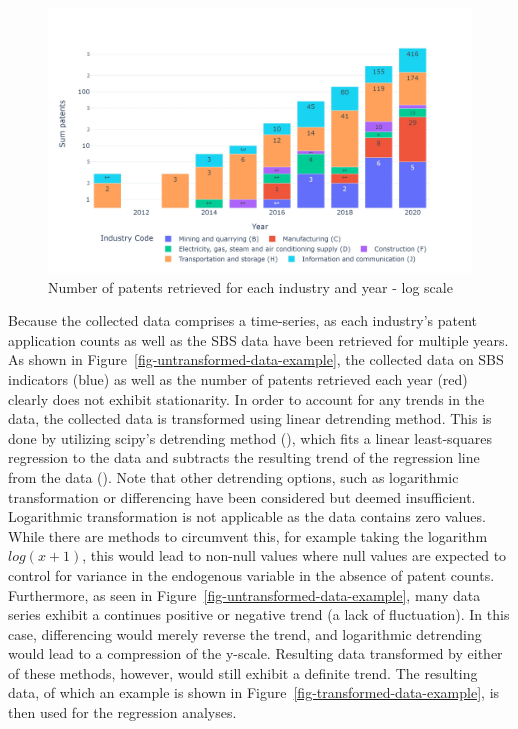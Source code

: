 \documentclass[
  12pt,
  a4paperpaper,
]{article}
\begin{document}
\begin{figure}[H]

{\centering \includegraphics{rieg2023_files/figure-pdf/fig-sum-patents-retrieved-output-1.jpeg}

}

\caption{\label{fig-sum-patents-retrieved}Number of patents retrieved
for each industry and year - log scale}

\end{figure}

Because the collected data comprises a time-series, as each industry's
patent application counts as well as the SBS data have been retrieved
for multiple years. As shown in
Figure~\ref{fig-untransformed-data-example}, the collected data on SBS
indicators (blue) as well as the number of patents retrieved each year
(red) clearly does not exhibit stationarity. In order to account for any
trends in the data, the collected data is transformed using linear
detrending method. This is done by utilizing scipy's detrending method
(), which fits
a linear least-squares regression to the data and subtracts the
resulting trend of the regression line from the data
(). Note that other detrending options, such as
logarithmic transformation or differencing have been considered but
deemed insufficient. Logarithmic transformation is not applicable as the
data contains zero values. While there are methods to circumvent this,
for example taking the logarithm \(log(x+1)\), this would lead to
non-null values where null values are expected to control for variance
in the endogenous variable in the absence of patent counts. Furthermore,
as seen in Figure~\ref{fig-untransformed-data-example}, many data series
exhibit a continues positive or negative trend (a lack of fluctuation).
In this case, differencing would merely reverse the trend, and
logarithmic detrending would lead to a compression of the y-scale.
Resulting data transformed by either of these methods, however, would
still exhibit a definite trend. The resulting data, of which an example
is shown in Figure~\ref{fig-transformed-data-example}, is then used for
the regression analyses.
\end{document}
